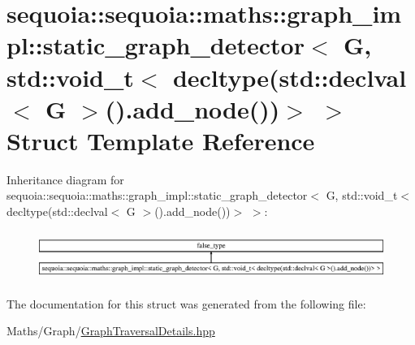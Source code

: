 \hypertarget{structsequoia_1_1sequoia_1_1maths_1_1graph__impl_1_1static__graph__detector_3_01_g_00_01std_1_1v6028a0d1baaab65196bd123bd237316d}{}\section{sequoia\+::sequoia\+::maths\+::graph\+\_\+impl\+::static\+\_\+graph\+\_\+detector$<$ G, std\+::void\+\_\+t$<$ decltype(std\+::declval$<$ G $>$().add\+\_\+node())$>$ $>$ Struct Template Reference}
\label{structsequoia_1_1sequoia_1_1maths_1_1graph__impl_1_1static__graph__detector_3_01_g_00_01std_1_1v6028a0d1baaab65196bd123bd237316d}
Inheritance diagram for sequoia\+::sequoia\+::maths\+::graph\+\_\+impl\+::static\+\_\+graph\+\_\+detector$<$ G, std\+::void\+\_\+t$<$ decltype(std\+::declval$<$ G $>$().add\+\_\+node())$>$ $>$\+:\begin{figure}[H]
\begin{center}
\leavevmode
\includegraphics[height=1.620839cm]{structsequoia_1_1sequoia_1_1maths_1_1graph__impl_1_1static__graph__detector_3_01_g_00_01std_1_1v6028a0d1baaab65196bd123bd237316d}
\end{center}
\end{figure}


The documentation for this struct was generated from the following file\+:\begin{DoxyCompactItemize}
\item 
Maths/\+Graph/\mbox{\hyperlink{_graph_traversal_details_8hpp}{Graph\+Traversal\+Details.\+hpp}}\end{DoxyCompactItemize}
